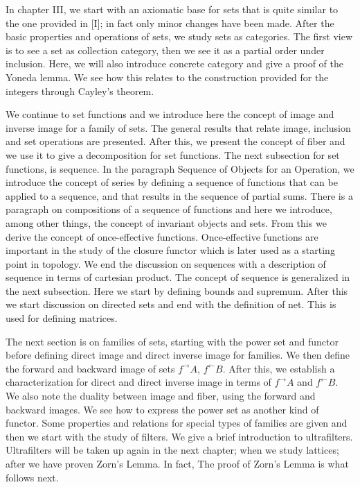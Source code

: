 \documentclass [12pt]{book}
\begin{document}
In chapter III, we start with an axiomatic base for sets that is quite similar to the one provided in [I]; in fact only minor changes have been made. After the basic properties and operations of sets, we study sets as categories. The first view is to see a set as collection category, then we see it as a partial order under inclusion. Here, we will also introduce concrete category and give a proof of the Yoneda lemma. We see how this relates to the construction provided for the integers through Cayley's theorem.

 We continue to set functions and we introduce here the concept of image and inverse image for a family of sets. The general results that relate image, inclusion and set operations are presented. After this, we present the concept of fiber and we use it to give a decomposition for set functions. The next subsection for set functions, is sequence. In the paragraph Sequence of Objects for an Operation, we introduce the concept of series by defining a sequence of functions that can be applied to a sequence, and that results in the sequence of partial sums. There is a paragraph on compositions of a sequence of functions and here we introduce, among other things, the concept of invariant objects and sets. From this we derive the concept of once-effective functions. Once-effective functions are important in the study of the closure functor which is later used as a starting point in topology. We end the discussion on sequences with a description of sequence in terms of cartesian product. The concept of sequence is generalized in the next subsection. Here we start by defining bounds and supremum. After this we start discussion on directed sets and end with the definition of net. This is used for defining matrices.

The next section is on families of sets, starting with the power set and functor before defining direct image and direct inverse image for families. We then define the forward and backward image of sets $f^\rightarrow A$, $f^\leftarrow B$. After this, we establish a characterization for direct and direct inverse image in terms of $f^\rightarrow A$ and $f^\leftarrow B$. We also note the duality between image and fiber, using the forward and backward images. We see how to express the power set as another kind of functor. Some properties and relations for special types of families are given and then we start with the study of filters. We give a brief introduction to ultrafilters. Ultrafilters will be taken up again in the next chapter; when we study lattices; after we have proven Zorn's Lemma. In fact, The proof of Zorn's Lemma is what follows next.
\end{document}
